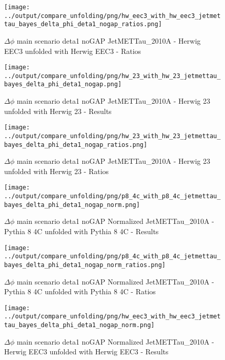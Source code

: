 \documentclass[11pt]{book}
\begin{document}
\begin{figure}[ht]
\centering
\texttt{[image: ../output/compare\_unfolding/png/hw\_eec3\_with\_hw\_eec3\_jetmettau\_bayes\_delta\_phi\_deta1\_nogap\_ratios.png]}
\caption{$\Delta\phi$ main scenario deta1 noGAP JetMETTau\_2010A - Herwig EEC3 unfolded with Herwig EEC3 - Ratios}
\label{hw_eec3_hw_eec3_jetmettau_bayes_delta_phi_deta1_nogap_b}
\end{figure}

\begin{figure}[ht]
\centering
\texttt{[image: ../output/compare\_unfolding/png/hw\_23\_with\_hw\_23\_jetmettau\_bayes\_delta\_phi\_deta1\_nogap.png]}
\caption{$\Delta\phi$ main scenario deta1 noGAP JetMETTau\_2010A - Herwig 23 unfolded with Herwig 23 - Results}
\label{hw_23_hw_23_jetmettau_bayes_delta_phi_deta1_nogap_a}
\end{figure}

\begin{figure}[ht]
\centering
\texttt{[image: ../output/compare\_unfolding/png/hw\_23\_with\_hw\_23\_jetmettau\_bayes\_delta\_phi\_deta1\_nogap\_ratios.png]}
\caption{$\Delta\phi$ main scenario deta1 noGAP JetMETTau\_2010A - Herwig 23 unfolded with Herwig 23 - Ratios}
\label{hw_23_hw_23_jetmettau_bayes_delta_phi_deta1_nogap_b}
\end{figure}


\begin{figure}[ht]
\centering
\texttt{[image: ../output/compare\_unfolding/png/p8\_4c\_with\_p8\_4c\_jetmettau\_bayes\_delta\_phi\_deta1\_nogap\_norm.png]}
\caption{$\Delta\phi$ main scenario deta1 noGAP Normalized JetMETTau\_2010A - Pythia 8 4C unfolded with Pythia 8 4C - Results}
\label{p8_p8_jetmettau_bayes_delta_phi_deta1_nogap_norm_a}
\end{figure}

\begin{figure}[ht]
\centering
\texttt{[image: ../output/compare\_unfolding/png/p8\_4c\_with\_p8\_4c\_jetmettau\_bayes\_delta\_phi\_deta1\_nogap\_norm\_ratios.png]}
\caption{$\Delta\phi$ main scenario deta1 noGAP Normalized JetMETTau\_2010A - Pythia 8 4C unfolded with Pythia 8 4C - Ratios}
\label{p8_p8_jetmettau_bayes_delta_phi_deta1_nogap_norm_b}
\end{figure}

\begin{figure}[ht]
\centering
\texttt{[image: ../output/compare\_unfolding/png/hw\_eec3\_with\_hw\_eec3\_jetmettau\_bayes\_delta\_phi\_deta1\_nogap\_norm.png]}
\caption{$\Delta\phi$ main scenario deta1 noGAP Normalized JetMETTau\_2010A - Herwig EEC3 unfolded with Herwig EEC3 - Results}
\label{hw_eec3_hw_eec3_jetmettau_bayes_delta_phi_deta1_nogap_norm_a}
\end{figure}
\end{document}
